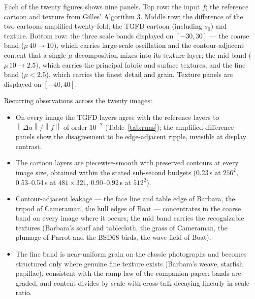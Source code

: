 \documentclass[11pt]{article}
\newcommand{\norm}[1]{\left\lVert #1 \right\rVert}
\begin{document}
Each of the twenty figures shows nine panels. Top row: the input $f$; the
reference cartoon and texture from Gilles' Algorithm 3. Middle row: the
difference of the two cartoons amplified twenty-fold; the TGFD cartoon
(including $s_0$) and texture. Bottom row: the three scale bands displayed
on $[-30,30]$ --- the coarse band ($\mu\,40\!\to\!10$), which carries
large-scale oscillation and the contour-adjacent content that a
single-$\mu$ decomposition mixes into its texture layer; the mid band
($\mu\,10\!\to\!2.5$), which carries the principal fabric and surface
textures; and the fine band ($\mu<2.5$), which carries the finest detail
and grain. Texture panels are displayed on $[-40,40]$.

Recurring observations across the twenty images:

\begin{itemize}
\item On every image the TGFD layers agree with the reference layers to
$\norm{\Delta u}/\norm{f}$ of order $10^{-2}$ (Table~\ref{tab:runs}); the
amplified difference panels show the disagreement to be edge-adjacent
ripple, invisible at display contrast.
\item The cartoon layers are piecewise-smooth with preserved contours at
every image size, obtained within the stated sub-second budgets
(0.23\,s at $256^2$, 0.53--0.54\,s at $481\times321$, 0.90--0.92\,s at
$512^2$).
\item Contour-adjacent leakage --- the face line and table edge of
Barbara, the tripod of Cameraman, the hull edges of Boat --- concentrates
in the coarse band on every image where it occurs; the mid band carries
the recognizable textures (Barbara's scarf and tablecloth, the grass of
Cameraman, the plumage of Parrot and the BSD68 birds, the wave field of
Boat).
\item The fine band is near-uniform grain on the classic photographs and
becomes structured only where genuine fine texture exists (Barbara's
weave, starfish papillae), consistent with the ramp law of the companion
paper: bands are graded, and content divides by scale with cross-talk
decaying linearly in scale ratio.
\end{itemize}
\end{document}
